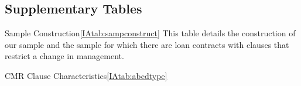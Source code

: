 \documentclass[12pt]{article}
\begin{document}
\begin{appendices}
%
%
\clearpage
\section{Supplementary Tables}
 \label{IApp:extra_tables}

\begin{singlespace}
\renewcommand{\tablesize}{\footnotesize}
\gdef\thetable{IA.\Roman{table}}



\begin{papertable}{Sample Construction}{\ref{IAtab:sampconstruct}}{\vspace{8pt}}
	\label{IAtab:sampconstruct}
    This table details the construction of our sample and the sample for which there are loan contracts with clauses that restrict a change in management.

    \startdata
    
\end{papertable}





\begin{landscapepapertable}{CMR Clause Characteristics}{\ref{IAtab:abcdtype}}{}
  \label{IAtab:abcdtype}


\end{landscapepapertable}
\end{singlespace}
\end{appendices}
\end{document}
